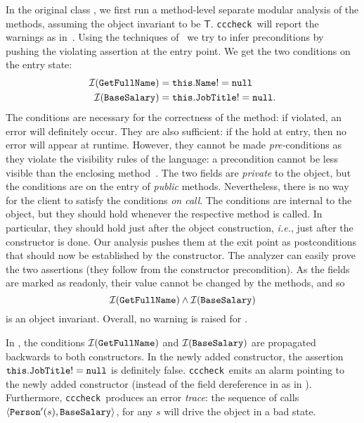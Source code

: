 \documentclass{llncs}
\newcommand{\refSec}[1]{\refSect{#1}}
\newcommand{\Pre}[1]{\mathcal{I}(#1)}
\newcommand{\cccheck}{\texttt{cccheck}}
\begin{document}
In the original class , we first run a method-level separate modular analysis of the methods, assuming the object invariant to be $\mathsf{T}$.
\cccheck\ will report the warnings as in~\refSec{methodlevelanalysis}.
Using the techniques of~\cite{CousotCousotLogozzo11} we try to infer preconditions by pushing the violating assertion at the entry point.
We get the two conditions on the entry state:
\[
\begin{split}
\Pre{\code{GetFullName}} & = \code{this.Name != null} \\
\Pre{\code{BaseSalary}}  & = \code{this.JobTitle != null}.
\end{split}
\]
The conditions are necessary  for the correctness of the method: if violated, an error will definitely occur.
They are also sufficient: if the hold at entry, then no error will appear at runtime.
However, they cannot be made \emph{pre-}conditions as they violate the visibility rules of the language: a precondition cannot be less visible than the enclosing method~\cite{eiffel}.
The two fields are \emph{private} to the object, but the conditions are on the entry of \emph{public} methods.
Nevertheless, there is no way for the client to satisfy  the conditions \emph{on call}.
The  conditions are internal to the object, but they should hold whenever the respective method is called.
In particular, they should hold just after the object construction, \emph{i.e.}, just after the constructor is done.
Our analysis pushes them at the  exit point as postconditions that should now be established by the constructor.
The analyzer  can easily prove the two assertions (they follow from the constructor precondition).
As the fields are marked as readonly, their value cannot be changed by the methods, and so 
\[
\Pre{\code{GetFullName}} \wedge \Pre{\code{BaseSalary}}
\]
is an object invariant.
Overall, no warning is raised for .

In , the conditions $\Pre{\code{GetFullName}}$ and $\Pre{\code{BaseSalary}}$ are propagated backwards to both constructors.
In the newly added constructor, the assertion $\mathtt{this.JobTitle != null}$ is  definitely false.
\cccheck\ emits an alarm pointing to the  newly added constructor (instead of the field dereference in  as in ).
Furthermore, \cccheck\ produces an error \emph{trace}: the sequence of calls  $\langle \mathtt{Person'}(s), \mathtt{BaseSalary} \rangle$, for any  $s$ will drive the object in a bad state.
\end{document}
